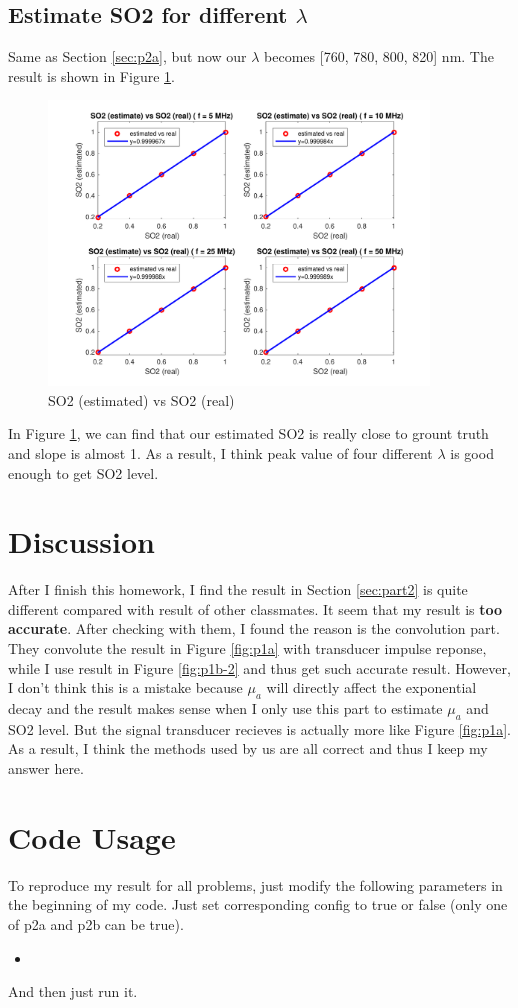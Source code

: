 \documentclass{article}
\newcommand{\cppscript}[1]{
    \begin{itemize}
        \item[]
    \end{itemize}
}
\begin{document}
\subsection{Estimate SO2 for different $\lambda$}
Same as Section \ref{sec:p2a}, but now our $\lambda$ becomes [760, 780, 800, 820] nm. The result is shown in Figure \ref{fig:p2b}.
\begin{figure}[H]
    \centering
    \includegraphics[width=0.9\textwidth]{src/p2b.pdf}
    \caption{SO2 (estimated) vs SO2 (real)}
    \label{fig:p2b}
\end{figure}
In Figure \ref{fig:p2b}, we can find that our estimated SO2 is really close to grount truth and slope is almost 1. As a result,
I think peak value of four different $\lambda$ is good enough to get SO2 level.

\section{Discussion}
After I finish this homework, I find the result in Section \ref{sec:part2} is quite different compared with result of
other classmates.  It seem that my result is \textbf{too accurate}. After checking with them, I found the reason is the 
convolution part. They convolute the result in Figure \ref{fig:p1a} with transducer impulse reponse, while I use result in
Figure \ref{fig:p1b-2} and thus get such accurate result. However, I don't think this is a mistake because $\mu_a$ will directly
affect the exponential decay and the result makes sense when I only use this part to estimate $\mu_a$ and SO2 level. But the signal
transducer recieves is actually more like Figure \ref{fig:p1a}. As a result, I think the methods used by us are all correct
and thus I keep my answer here.

\newpage
\section{Code Usage}
To reproduce my result for all problems, just modify the following parameters in the beginning of my code. Just set corresponding
config to true or false (only one of p2a and p2b can be true).
\cppscript{src/code.m}
And then just run it.
\end{document}
